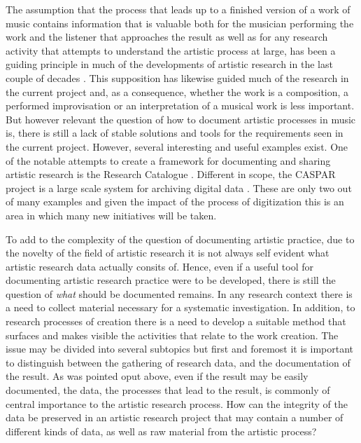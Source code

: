 \documentclass[,a4paper]{llncs}
\begin{document}
The assumption that the process that leads up to a finished version of a work of music contains information that is valuable both for the musician performing the work and the listener that approaches the result as well as for any research activity that attempts to understand the artistic process at large, has been a guiding principle in much of the developments of artistic research in the last couple of decades \cite{biggs10}. This supposition has likewise guided much of the research in the current project and, as a consequence, whether the work is a composition, a performed improvisation or an interpretation of a musical work is less important. But however relevant the question of how to document artistic processes in music is, there is still a lack of stable solutions and tools for the requirements seen in the current project. However, several interesting and useful examples exist. One of the notable attempts to create a framework for documenting and sharing artistic research is the Research Catalogue \cite{rc2017}. Different in scope, the CASPAR project is a large scale system for archiving digital data \cite{Douglas2007,Roeder2006,Bachimont2003,cuervo2011}. These are only two out of many examples and given the impact of the process of digitization this is an area in which many new initiatives will be taken.

To add to the complexity of the question of documenting artistic practice, due to the novelty of the field of artistic research it is not always self evident what artistic research data actually consits of. Hence, even if a useful tool for documenting artistic research practice were to be developed, there is still the question of \emph{what} should be documented remains. In any research context there is a need to collect material necessary for a systematic investigation. In addition, to research processes of creation there is a need to develop a suitable method that surfaces and makes visible the activities that relate to the work creation. The issue may be divided into several subtopics but first and foremost it is important to distinguish between the gathering of research data, and the documentation of the result. As was pointed oput above, even if the result may be easily documented, the data, the processes that lead to the result, is commonly of central importance to the artistic research process. How can the integrity of the data be preserved in an artistic research project that may contain a number of different kinds of data, as well as raw material from the artistic process? 
\end{document}

